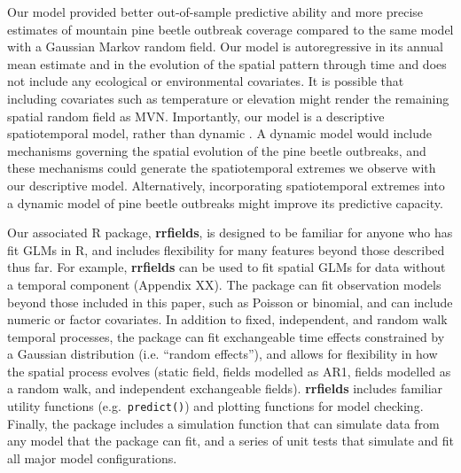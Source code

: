 \documentclass[12pt,english]{article}
\begin{document}
\begin{spacing}{1.3}
Our model provided better out-of-sample predictive ability and more precise
estimates of mountain pine beetle outbreak coverage compared to the same model
with a Gaussian Markov random field. Our model is autoregressive in its annual
mean estimate and in the evolution of the spatial pattern through time and does
not include any ecological or environmental covariates. It is possible that
including covariates such as temperature or elevation might render the remaining
spatial random field as MVN. Importantly, our model is a descriptive
spatiotemporal model, rather than dynamic \citep{cressie2011}. A dynamic model
would include mechanisms governing the spatial evolution of the pine beetle
outbreaks, and these mechanisms could generate the spatiotemporal extremes we
observe with our descriptive model. Alternatively, incorporating spatiotemporal
extremes into a dynamic model of pine beetle outbreaks might improve its
predictive capacity.

Our associated R package, \textbf{rrfields}, is designed to be familiar for
anyone who has fit GLMs in R, and includes flexibility for many features beyond
those described thus far. For example, \textbf{rrfields} can be used to fit
spatial GLMs for data without a temporal component (Appendix XX). The package
can fit observation models beyond those included in this paper, such as Poisson
or binomial, and can include numeric or factor covariates. In addition to fixed,
independent, and random walk temporal processes, the package can fit
exchangeable time effects constrained by a Gaussian distribution (i.e. ``random
effects''), and allows for flexibility in how the spatial process evolves
(static field, fields modelled as AR1, fields modelled as a random walk, and
independent exchangeable fields). \textbf{rrfields} includes familiar utility
functions (e.g.\ \texttt{predict()}) and plotting functions for model checking.
Finally, the package includes a simulation function that can simulate data from
any model that the package can fit, and a series of unit tests that simulate and
fit all major model configurations.


\end{spacing}
\end{document}
